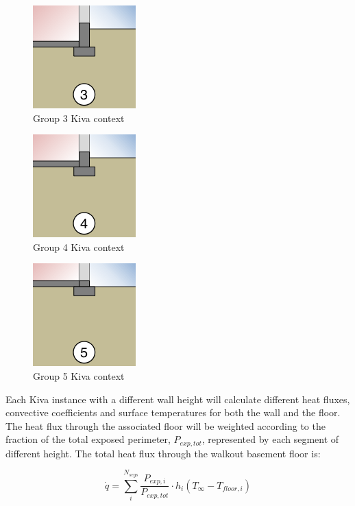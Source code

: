 \begin{figure}
\centering
\includegraphics{media/kiva-walkout-2d-3.png}
\caption{Group 3 Kiva context\label{fig:wo-3}}
\end{figure}

\begin{figure}
\centering
\includegraphics{media/kiva-walkout-2d-4.png}
\caption{Group 4 Kiva context\label{fig:wo-4}}
\end{figure}

\begin{figure}
\centering
\includegraphics{media/kiva-walkout-2d-5.png}
\caption{Group 5 Kiva context\label{fig:wo-5}}
\end{figure}

Each Kiva instance with a different wall height will calculate different
heat fluxes, convective coefficients and surface temperatures for both
the wall and the floor. The heat flux through the associated floor will
be weighted according to the fraction of the total exposed perimeter,
\(P_{exp,tot}\), represented by each segment of different height. The
total heat flux through the walkout basement floor is:

\begin{equation}
\dot{q} = \sum^{N_{segs}}_i{\frac{P_{exp,i}}{P_{exp,tot}}}\cdot h_i \left(T_\infty - T_{floor,i} \right)
\end{equation}

